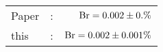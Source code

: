       \begin{tabular}{lcr}
          Paper &:& $\mathrm{Br}  = 0.002\pm 0.\%$ \\
          this      &:& $\mathrm{Br}  = 0.002\pm 0.001\%$ \\        
      \end{tabular}
